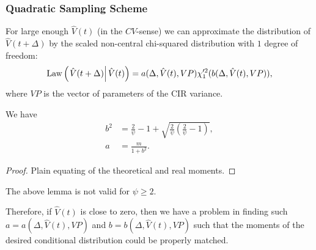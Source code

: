             \subsubsection{Quadratic Sampling Scheme}
                For large enough $\hat{V}(t)$ (in the $CV$-sense) we can approximate the distribution of $\hat{V}(t+\Delta)$ by the scaled non-central chi-squared distribution with $1$ degree of freedom:
                \begin{align}
                    \operatorname*{Law}\left(\left.\hat{V}(t+\Delta) \right| \hat V(t)\right) =  a(\Delta, \hat{V}(t), VP) \chi'^2_1(b(\Delta, \hat{V}(t), VP)),
                \end{align}
                where $VP$ is the vector of parameters of the CIR variance.
                \begin{lemma}
                    We have
                    \begin{align}
                        b^2 &= \frac{2}{\psi} -1 +\sqrt{\frac{2}{\psi}\left(\frac{2}{\psi}-1\right)}, \\ 
                        a   &= \frac{m}{1+b^2}.
                    \end{align}
                \end{lemma}
                \begin{proof}
                    {\color{red}Plain equating of the theoretical and real moments.}

                \end{proof}
                \begin{remark}
                    The above lemma is not valid for $\psi \geq 2$.
                \end{remark}
                Therefore, if $\hat{V}(t)$ is close to zero, then we have a problem in finding such $a = a(\Delta, \hat{V}(t), VP)$ and $b = b(\Delta, \hat{V}(t), VP)$ such that the moments of the desired conditional distribution could be properly matched.

